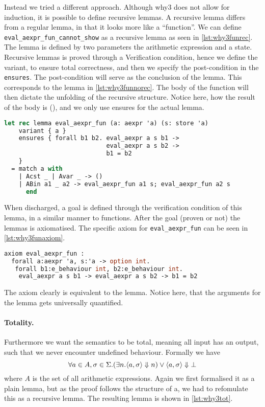 Instead we tried a different approach. Although why3 does not allow for induction, it is possible to define
recursive lemmas. A recursive lemma differs from a regular lemma, in that it looks more like a ``function''.
We can define \texttt{eval_aexpr_fun_cannot_show} as a recursive lemma as seen in \autoref{lst:why3funrec}.
The lemma is defined by two parameters the arithmetic expression and a state.
Recursive lemmas is proved through a Verification condition,
hence we define the variant, to ensure total correctness,
and then we specify the post-condition in the \texttt{ensures}.
The post-condition will serve as the conclusion of the lemma.
This corresponds to the lemma in \autoref{lst:why3funnorec}.
The body of the function will then dictate the unfolding of the recursive structure.
Notice here, how the result of the body is (), and we only use ensures for the actual lemma.

\begin{lstlisting}[caption={Recursive lemma for functional arithmetic expressions},label={lst:why3funrec},language=sml]
let rec lemma eval_aexpr_fun (a: aexpr 'a) (s: store 'a)
    variant { a }
    ensures { forall b1 b2. eval_aexpr a s b1 ->
                            eval_aexpr a s b2 ->
                            b1 = b2
    }
  = match a with
    | Acst _ | Avar _ -> ()
    | ABin a1 _ a2 -> eval_aexpr_fun a1 s; eval_aexpr_fun a2 s
      end
\end{lstlisting}

When discharged, a goal is defined through the verification condition of this lemma, in a similar manner to functions.
After the goal (proven or not) the lemmas is axiomatised. The specific axiom for \texttt{eval_aexpr_fun} can be seen in \autoref{lst:why3funaxiom}.

\begin{lstlisting}[caption={Axiom of functional lemma},label={lst:why3funaxiom},language=sml]
axiom eval_aexpr_fun :
  forall a:aexpr 'a, s:'a -> option int.
   forall b1:e_behaviour int, b2:e_behaviour int.
    eval_aexpr a s b1 -> eval_aexpr a s b2 -> b1 = b2
\end{lstlisting}

The axiom clearly is equivalent to the lemma. Notice here, that the arguments for the lemma gets universally quantified.

\paragraph{Totality.}
Furthermore we want the semantics to be total, meaning all input has an output, such that we never encounter undefined behaviour.
Formally we have
\[
\forall a \in A, \sigma \in \Sigma. (\exists n. \langle a, \sigma \rangle \Downarrow n) \vee \langle a, \sigma \rangle \Downarrow \bot
\]
where $A$ is the set of all arithmetic expressions.
Again we first formalised it as a plain lemma, but as the proof follows the structure of a,
we had to refomulate this as a recursive lemma. The resulting lemma is shown in \autoref{lst:why3tot}.

